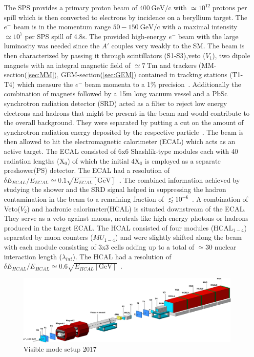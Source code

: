 The SPS provides a primary proton beam of $400~\mathrm{GeV/c}$ with $\simeq 10^{12}$ protons per spill which is then converted to electrons by incidence on a beryllium target. The $e^-$ beam is in the momentum range $50-150~\mathrm{GeV/c}$ with a maximal intensity $\simeq 10^{7}$ per SPS spill of 4.8s. The provided high-energy $e^-$ beam with the large luminosity was needed since the $A'$ couples very weakly to the SM. The beam is then characterized by passing it through scintillators (S1-S3),veto ($V_1$), two dipole magnets with an integral magnetic field of $\simeq 7~\mathrm{Tm}$ and trackers (MM-section(\ref{sec:MM}), GEM-section(\ref{sec:GEM}) contained in tracking stations (T1-T4) which measure the $e^-$ beam momenta to a 1\% precision~\cite{article_beam_purity}. Additionally the combination of magnets followed by a 15m long vacuum vessel and a PbSc synchrotron radiation detector (SRD) acted as a filter to reject low energy electrons and hadrons that might be present in the beam and would contribute to the overall background. They were separated by putting a cut on the amount of synchrotron radiation energy deposited by the respective particle~\cite{Gninenko:2013rka}. The beam is then allowed to hit the electromagnetic calorimeter (ECAL) which acts as an active target. The ECAL consisted of 6x6 Shashlik-type modules each with 40 radiation lengths ($\mathrm{X_0}$) of which the initial 4$\mathrm{X_0}$ is employed as a separate preshower(PS) detector. The ECAL had a resolution of $\delta E_{ECAL}/E_{ECAL} \simeq 0.1 \sqrt{E_{ECAL}[\text{GeV}]}$~\cite{Banerjee:2016tad}.
The combined information achieved by studying the shower and the SRD signal helped in suppressing the hadron contamination in the beam to a remaining fraction of $ \lesssim 10^{-6}$~\cite{Depero:2017mrr}. A combination of Veto($V_2$) and hadronic calorimeter(HCAL) is situated downstream of the ECAL. They serve as a veto against muons, neutrals like high energy photons or hadrons produced in the target ECAL. The HCAL consisted of four modules ($\text{HCAL}_{1-4}$) separated by muon counters ($MU_{1-4}$) and were slightly shifted along the beam with each module consisting of 3x3 cells adding up to a total of $\simeq$30 nuclear interaction length ($\lambda_{int}$). The HCAL had a resolution of $\delta E_{HCAL}/E_{HCAL} \simeq 0.6 \sqrt{E_{HCAL}[\text{GeV}]}$~\cite{Banerjee:2016tad}.

\begin{figure}[t!]
\centering
\includegraphics[width=\textwidth]{thesis_figures/Visible_3d_setup.png}
\caption{Visible mode setup 2017~\cite{Banerjee_2018}}
\label{fig:Visible_mode_setup}
\end{figure}

